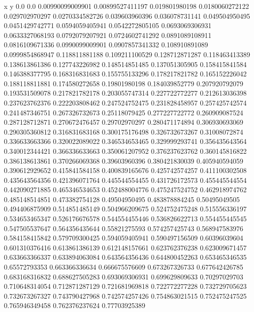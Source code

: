               x                y
            0.0              0.0
0.00990099009901  0.00899527411197
 0.019801980198  0.0180060272122
 0.029702970297  0.0270334582726
 0.039603960396   0.036078731141
 0.049504950495  0.0451429742771
0.0594059405941  0.0542272805105
0.0693069306931  0.0633327068193
0.0792079207921  0.0724602741292
0.0891089108911  0.0816109671336
0.0990099009901  0.0907857341332
 0.108910891089  0.0999854868947
 0.118811881188   0.109211100529
 0.128712871287   0.118463413389
 0.138613861386   0.127743226982
 0.148514851485   0.137051305905
 0.158415841584   0.146388377795
 0.168316831683   0.155755133296
 0.178217821782   0.165152226042
 0.188118811881   0.174580272658
  0.19801980198   0.184039852779
 0.207920792079   0.193531509078
 0.217821782178   0.203055747314
 0.227722772277   0.212613036398
 0.237623762376   0.222203808462
 0.247524752475   0.231828458957
 0.257425742574   0.241487346751
 0.267326732673    0.25118079425
 0.277227722772   0.260909087524
 0.287128712871   0.270672476457
  0.29702970297   0.280471174894
 0.306930693069   0.290305360812
 0.316831683168   0.300175176498
 0.326732673267    0.31008072874
 0.336633663366   0.320022089022
 0.346534653465   0.329999293741
 0.356435643564   0.340012344421
 0.366336633663   0.350061207952
 0.376237623762   0.360145816822
 0.386138613861   0.370266069368
  0.39603960396   0.380421830039
 0.405940594059   0.390612929652
 0.415841584158   0.400839165676
 0.425742574257   0.411100302508
 0.435643564356   0.421396071764
 0.445544554455   0.431726172573
 0.455445544554   0.442090271885
 0.465346534653   0.452488004776
 0.475247524752   0.462918974762
 0.485148514851   0.473382754128
  0.49504950495   0.483878884245
  0.50495049505   0.494406875909
 0.514851485149   0.504966209675
 0.524752475248   0.515556336197
 0.534653465347   0.526176676578
 0.544554455446   0.536826622713
 0.554455445545   0.547505537647
 0.564356435644    0.55821275593
 0.574257425743   0.568947583976
 0.584158415842   0.579709300425
 0.594059405941   0.590497156509
  0.60396039604   0.601310376416
 0.613861386139   0.612148157661
 0.623762376238   0.623009671457
 0.633663366337   0.633894063084
 0.643564356436   0.644800452263
 0.653465346535    0.65572793353
 0.663366336634   0.666675576609
 0.673267326733   0.677642426785
 0.683168316832   0.688627505283
 0.693069306931   0.699629809633
  0.70297029703   0.710648314054
 0.712871287129   0.721681969818
 0.722772277228   0.732729705623
 0.732673267327   0.743790427968
 0.742574257426   0.754863021515
 0.752475247525   0.765946349458
 0.762376237624    0.77703925389
